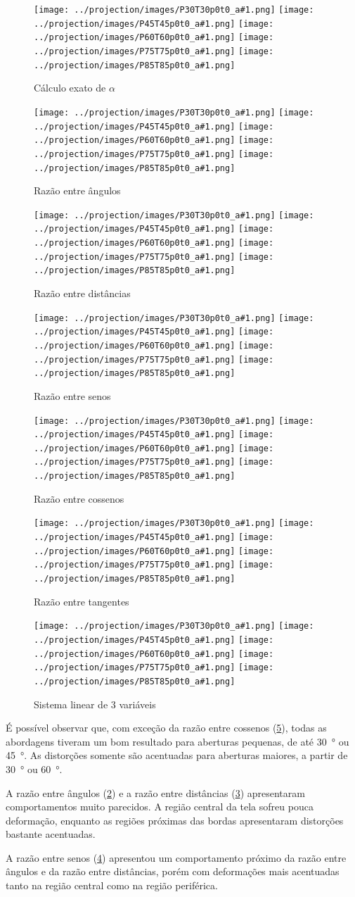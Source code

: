 \documentclass[brazil,pagestart=firstchapter]{abnt}
\newcommand*{\resultadoimagens}[1]{
	\texttt{[image: ../projection/images/P30T30p0t0\_a\#1.png]}
	\texttt{[image: ../projection/images/P45T45p0t0\_a\#1.png]}
	\texttt{[image: ../projection/images/P60T60p0t0\_a\#1.png]}
	\texttt{[image: ../projection/images/P75T75p0t0\_a\#1.png]}
	\texttt{[image: ../projection/images/P85T85p0t0\_a\#1.png]}
}
\begin{document}
\begin{figure}
\centering
\resultadoimagens{12}
\caption{Cálculo exato de $\alpha$}
\label{fig:resultado_exact}
\end{figure}

\begin{figure}
\centering
\resultadoimagens{7}
\caption{Razão entre ângulos}
\label{fig:resultado_angulo}
\end{figure}

\begin{figure}
\centering
\resultadoimagens{11}
\caption{Razão entre distâncias}
\label{fig:resultado_dist}
\end{figure}

\begin{figure}
\centering
\resultadoimagens{9}
\caption{Razão entre senos}
\label{fig:resultado_sin}
\end{figure}


\begin{figure}
\centering
\resultadoimagens{8}
\caption{Razão entre cossenos}
\label{fig:resultado_cos}
\end{figure}

\begin{figure}
\centering
\resultadoimagens{10}
\caption{Razão entre tangentes}
\label{fig:resultado_tan}
\end{figure}

\begin{figure}
\centering
\resultadoimagens{13}
\caption{Sistema linear de 3 variáveis}
\label{fig:resultado_lineq}
\end{figure}

É possível observar que, com exceção da razão entre cossenos
(\ref{fig:resultado_cos}), todas as abordagens tiveram um bom resultado para
aberturas pequenas, de até \SI{30}{\degree} ou \SI{45}{\degree}. As
distorções somente são acentuadas para aberturas maiores, a partir de
\SI{30}{\degree} ou \SI{60}{\degree}.

A razão entre ângulos (\ref{fig:resultado_angulo}) e a razão entre
distâncias (\ref{fig:resultado_dist}) apresentaram comportamentos muito
parecidos. A região central da tela sofreu pouca deformação, enquanto as
regiões próximas das bordas apresentaram distorções bastante acentuadas.

A razão entre senos (\ref{fig:resultado_sin}) apresentou um comportamento
próximo da razão entre ângulos e da razão entre distâncias, porém com
deformações mais acentuadas tanto na região central como na região
periférica.
\end{document}
